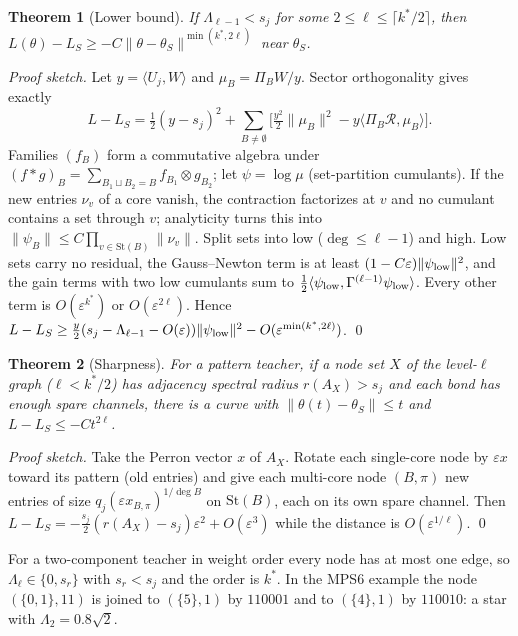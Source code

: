\documentclass[11pt]{article}
\newcommand{\St}{\mathrm{St}}
\newtheorem*{thm*}{Theorem}
\begin{document}
\begin{thm*}[Lower bound]
If $\Lambda_{\ell-1}<s_j$ for some $2\le\ell\le\lceil k^*/2\rceil$, then
$L(\theta)-L_S\ge-C\lVert\theta-\theta_S\rVert^{\min(k^*,2\ell)}$ near $\theta_S$.
\end{thm*}
\emph{Proof sketch.} Let $y=\langle U_j,W\rangle$ and $\mu_B=\Pi_BW/y$. Sector orthogonality gives exactly
\[
L-L_S=\tfrac12(y-s_j)^2+\sum_{B\ne\emptyset}\Big[\tfrac{y^2}{2}\lVert\mu_B\rVert^2-y\langle\Pi_B\mathcal R,\mu_B\rangle\Big].
\]
Families $(f_B)$ form a commutative algebra under $(f*g)_B=\sum_{B_1\sqcup B_2=B}f_{B_1}\otimes g_{B_2}$; let
$\psi=\log\mu$ (set-partition cumulants). If the new entries $\nu_v$ of a core vanish, the contraction factorizes
at $v$ and no cumulant contains a set through $v$; analyticity turns this into
$\lVert\psi_B\rVert\le C\prod_{v\in\St(B)}\lVert\nu_v\rVert$. Split sets into low ($\deg\le\ell-1$) and high. Low sets carry
no residual, the Gauss--Newton term is at least $(1-C\varepsilon)\lVert\psi_{\rm low}\rVert^2$, and the gain terms
with two low cumulants sum to $\tfrac12\langle\psi_{\rm low},\Gamma^{(\ell-1)}\psi_{\rm low}\rangle$. Every other term
is $O(\varepsilon^{k^*})$ or $O(\varepsilon^{2\ell})$. Hence
$L-L_S\ge\tfrac y2(s_j-\Lambda_{\ell-1}-O(\varepsilon))\lVert\psi_{\rm low}\rVert^2-O(\varepsilon^{\min(k^*,2\ell)})$. \qed

\begin{thm*}[Sharpness]
For a pattern teacher, if a node set $X$ of the level-$\ell$ graph ($\ell<k^*/2$) has adjacency spectral radius
$r(A_X)>s_j$ and each bond has enough spare channels, there is a curve with
$\lVert\theta(t)-\theta_S\rVert\le t$ and $L-L_S\le-Ct^{2\ell}$.
\end{thm*}
\emph{Proof sketch.} Take the Perron vector $x$ of $A_X$. Rotate each single-core node by $\varepsilon x$ toward its
pattern (old entries) and give each multi-core node $(B,\pi)$ new entries of size
$q_j(\varepsilon x_{B,\pi})^{1/\deg B}$ on $\St(B)$, each on its own spare channel. Then
$L-L_S=-\tfrac{s_j}{2}(r(A_X)-s_j)\varepsilon^2+O(\varepsilon^3)$ while the distance is $O(\varepsilon^{1/\ell})$. \qed

For a two-component teacher in weight order every node has at most one edge, so $\Lambda_\ell\in\{0,s_r\}$ with
$s_r<s_j$ and the order is $k^*$. In the MPS6 example the node $(\{0,1\},11)$ is joined to $(\{5\},1)$ by $110001$
and to $(\{4\},1)$ by $110010$: a star with $\Lambda_2=0.8\sqrt2$.
\end{document}
